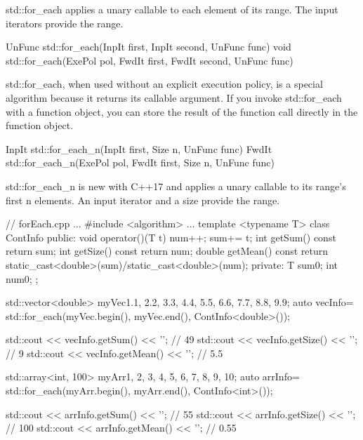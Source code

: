 std::for\_each applies a unary callable to each element of its range. The input iterators provide the range.

\begin{cpp}
UnFunc std::for_each(InpIt first, InpIt second, UnFunc func)
void std::for_each(ExePol pol, FwdIt first, FwdIt second, UnFunc func)
\end{cpp}

std::for\_each, when used without an explicit execution policy, is a special algorithm because it returns its callable argument. If you invoke std::for\_each with a function object, you can store the result of the function call directly in the function object.

\begin{cpp}
InpIt std::for_each_n(InpIt first, Size n, UnFunc func) FwdIt std::for_each_n(ExePol pol, FwdIt first, Size n, UnFunc func)
\end{cpp}

std::for\_each\_n is new with C++17 and applies a unary callable to its range’s first n elements. An input iterator and a size provide the range.


\begin{cpp}
// forEach.cpp
...
#include <algorithm>
...
template <typename T>
class ContInfo{
public:
	void operator()(T t){
		num++;
		sum+= t;
	}
	int getSum() const{ return sum; }
	int getSize() const{ return num; }
	double getMean() const{
		return static_cast<double>(sum)/static_cast<double>(num);
	}
private:
	T sum{0};
	int num{0};
};

std::vector<double> myVec{1.1, 2.2, 3.3, 4.4, 5.5, 6.6, 7.7, 8.8, 9.9};
auto vecInfo= std::for_each(myVec.begin(), myVec.end(), ContInfo<double>());

std::cout << vecInfo.getSum() << '\n'; // 49
std::cout << vecInfo.getSize() << '\n'; // 9
std::cout << vecInfo.getMean() << '\n'; // 5.5

std::array<int, 100> myArr{1, 2, 3, 4, 5, 6, 7, 8, 9, 10};
auto arrInfo= std::for_each(myArr.begin(), myArr.end(), ContInfo<int>());

std::cout << arrInfo.getSum() << '\n'; // 55
std::cout << arrInfo.getSize() << '\n'; // 100
std::cout << arrInfo.getMean() << '\n'; // 0.55
\end{cpp}

























